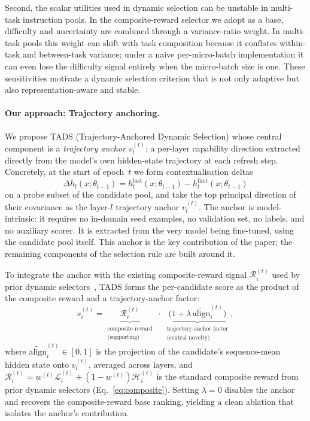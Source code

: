 Second, the scalar utilities used in dynamic selection can be
unstable in multi-task instruction pools. In the composite-reward
selector we adopt as a base, difficulty and uncertainty are
combined through a variance-ratio weight. In multi-task pools this
weight can shift with task composition because it conflates
within-task and between-task variance; under a naive
per-micro-batch implementation it can even lose the difficulty
signal entirely when the micro-batch size is one. These
sensitivities motivate a dynamic selection criterion that is not
only adaptive but also representation-aware and stable.

\paragraph{Our approach: Trajectory anchoring.}
We propose \textsc{TADS} (Trajectory-Anchored Dynamic Selection)
whose central component is a \emph{trajectory anchor}
$v_l^{(t)}$: a per-layer capability direction extracted directly
from the model's own hidden-state trajectory at each refresh step.
Concretely, at the start of epoch~$t$ we form contextualisation
deltas
\[
\Delta h_l(x;\theta_{t-1})
=
h_l^{\mathrm{last}}(x;\theta_{t-1})
-
h_l^{\mathrm{first}}(x;\theta_{t-1})
\]
on a probe subset of the candidate pool, and take the top principal
direction of their covariance as the layer-$l$ trajectory anchor
$v_l^{(t)}$. The anchor is model-intrinsic: it requires no
in-domain seed examples, no validation set, no labels, and no
auxiliary scorer. It is extracted from the very model being
fine-tuned, using the candidate pool itself. This anchor is the
key contribution of the paper; the remaining components of the
selection rule are built around it.

To integrate the anchor with the existing composite-reward signal
$\mathcal{R}_i^{(t)}$ used by prior dynamic
selectors~\cite{kung2023activeit, sun2025dots}, \textsc{TADS} forms
the per-candidate score as the product of the composite reward
and a trajectory-anchor factor:
\[
s_i^{(t)}
=
\underbrace{\mathcal{R}_i^{(t)}}_{\substack{\text{composite reward}\\[1pt]\text{(supporting)}}}
\;\cdot\;
\underbrace{\bigl(1+\lambda\,\widetilde{\mathrm{align}}_i^{(t)}\bigr)}_{\substack{\text{trajectory-anchor factor}\\[1pt]\text{(central novelty)}}},
\]
where $\widetilde{\mathrm{align}}_i^{(t)}\in[0,1]$ is the
projection of the candidate's sequence-mean hidden state onto
$v_l^{(t)}$, averaged across layers, and
$\mathcal{R}_i^{(t)} = w^{(t)}\mathcal{L}_i^{(t)} +
(1-w^{(t)})\mathcal{H}_i^{(t)}$ is the standard composite reward
from prior dynamic selectors (Eq.~\ref{eq:composite}). Setting
$\lambda=0$ disables the anchor and recovers the composite-reward
base ranking, yielding a clean ablation that isolates the anchor's
contribution.

